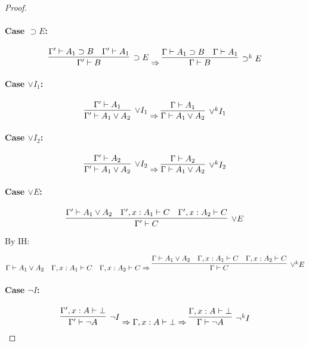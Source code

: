 \documentclass{article}
\begin{document}
\begin{proof}
    \paragraph{Case \(\supset E\):}
    
    \[
    \infer[\supset E]{\Gamma' \vdash B}{
      \Gamma' \vdash A_1 \supset B \quad \Gamma' \vdash A_1
    }
    \Rightarrow
    \infer[\supset^k E]{\Gamma \vdash B}{
      \Gamma \vdash A_1 \supset B \quad \Gamma \vdash A_1
    }
    \]
    
    \paragraph{Case \(\lor I_1\):}
    
    \[
    \infer[\lor I_1]{\Gamma' \vdash A_1 \lor A_2}{
      \Gamma' \vdash A_1
    }
    \Rightarrow
    \infer[\lor^k I_1]{\Gamma \vdash A_1 \lor A_2}{
      \Gamma \vdash A_1
    }
    \]
    
    \paragraph{Case \(\lor I_2\):}
    
    \[
    \infer[\lor I_2]{\Gamma' \vdash A_1 \lor A_2}{
      \Gamma' \vdash A_2
    }
    \Rightarrow
    \infer[\lor^k I_2]{\Gamma \vdash A_1 \lor A_2}{
      \Gamma \vdash A_2
    }
    \]
    
    \paragraph{Case \(\lor E\):}
    
    \[
    \infer[\lor E]{\Gamma' \vdash C}{
      \Gamma' \vdash A_1 \lor A_2 \quad
      \Gamma', x:A_1 \vdash C \quad
      \Gamma', x:A_2 \vdash C
    }
    \]
    
    By IH:
    
    \[
    \Gamma \vdash A_1 \lor A_2 \quad \Gamma, x:A_1 \vdash C \quad \Gamma, x:A_2 \vdash C
    \Rightarrow
    \infer[\lor^k E]{\Gamma \vdash C}{
      \Gamma \vdash A_1 \lor A_2 \quad
      \Gamma, x:A_1 \vdash C \quad
      \Gamma, x:A_2 \vdash C
    }
    \]
    
    \paragraph{Case \(\neg I\):}
    
    \[
    \infer[\neg I]{\Gamma' \vdash \neg A}{
      \Gamma', x:A \vdash \bot
    }
    \Rightarrow
    \Gamma, x:A \vdash \bot \Rightarrow
    \infer[\neg^k I]{\Gamma \vdash \neg A}{
      \Gamma, x:A \vdash \bot
    }
    \]
    

\end{proof}
\end{document}

